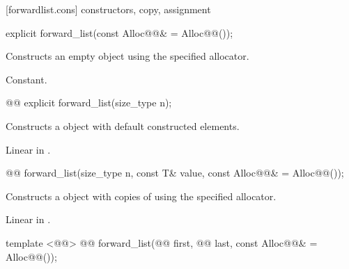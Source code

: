 \documentclass[american,twoside]{book}
\begin{document}
[forwardlist.cons]{ constructors, copy, assignment}

\begin{itemdecl}
explicit forward_list(const Alloc@@& = Alloc@@());
\end{itemdecl}

\begin{itemdescr}
\pnum
\effects Constructs an empty  object using the specified allocator.

\pnum
\complexity Constant.
\end{itemdescr}

\begin{itemdecl}
@@ 
  explicit forward_list(size_type n);
\end{itemdecl}

\begin{itemdescr}
\pnum
\effects Constructs a  object with  default constructed elements.

\pnum
{}

\pnum
\complexity Linear in .
\end{itemdescr}

\begin{itemdecl}
@@ 
  forward_list(size_type n, const T& value, const Alloc@@& = Alloc@@());
\end{itemdecl}

\begin{itemdescr}
\pnum
\effects Constructs a  object with  copies of  using the specified allocator.

\pnum
{}

\pnum
\complexity Linear in .
\end{itemdescr}

\begin{itemdecl}
template <@@>
  @@
  forward_list(@@ first, @@ last, 
               const Alloc@@& = Alloc@@()); 
\end{itemdecl}
\end{document}
